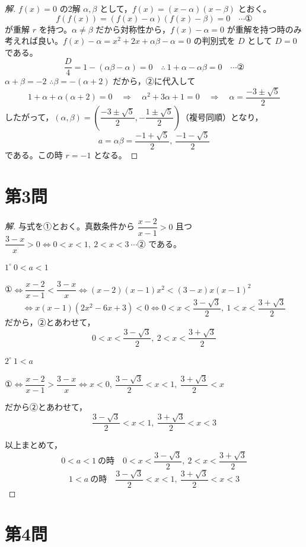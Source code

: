 \documentclass[../main.tex]{subfiles}
\begin{document}
\begin{proof}[解]
  $f(x)=0$ の2解 $\alpha,\beta$ として，$f(x)=(x-\alpha)(x-\beta)$ とおく。
  \[
    f(f(x))=(f(x)-\alpha)(f(x)-\beta)=0 \quad \cdots \text{①}
  \]
  が重解 $r$ を持つ。$\alpha\ne\beta$ だから対称性から，$f(x)-\alpha=0$ が重解を持つ時のみ考えれば良い。$f(x)-\alpha=x^2+2x+\alpha\beta-\alpha=0$ の判別式を $D$ として $D=0$ である。
  \[
    \frac{D}{4}=1-(\alpha\beta-\alpha)=0 \quad\therefore\ 1+\alpha-\alpha\beta=0 \quad \cdots \text{②}
  \]
  $\alpha+\beta=-2$ $\therefore \beta=-(\alpha+2)$ だから，②に代入して
  \[
    1+\alpha+\alpha(\alpha+2)=0 \quad\Longrightarrow\quad \alpha^2+3\alpha+1=0 \quad\Longrightarrow\quad \alpha=\frac{-3\pm\sqrt5}{2}
  \]
  したがって，$(\alpha,\beta)=\left(\dfrac{-3\pm\sqrt5}{2},-\dfrac{1\pm\sqrt5}{2}\right)$（複号同順）となり，
  \[
    a=\alpha\beta=\frac{-1+\sqrt5}{2},\ \frac{-1-\sqrt5}{2}
  \]
  である。この時 $r=-1$ となる。
\end{proof}

\newpage

\section*{第3問}

\begin{proof}[解]
  与式を①とおく。真数条件から $\dfrac{x-2}{x-1}>0$ 且つ $\dfrac{3-x}{x}>0 \iff 0<x<1,\ 2<x<3\ \cdots$② である。

  \textbf{$1^\circ\ 0<a<1$}

  ①$\iff \dfrac{x-2}{x-1}<\dfrac{3-x}{x} \iff (x-2)(x-1)x^2<(3-x)x(x-1)^2$
  \[
    \iff x(x-1)(2x^2-6x+3)<0 \iff 0<x<\frac{3-\sqrt3}{2},\ 1<x<\frac{3+\sqrt3}{2}
  \]
  だから，②とあわせて，
  \[
    0<x<\frac{3-\sqrt3}{2},\ 2<x<\frac{3+\sqrt3}{2}
  \]

  \textbf{$2^\circ\ 1<a$}

  ①$\iff \dfrac{x-2}{x-1}>\dfrac{3-x}{x} \iff x<0,\ \dfrac{3-\sqrt3}{2}<x<1,\ \dfrac{3+\sqrt3}{2}<x$

  だから②とあわせて，
  \[
    \frac{3-\sqrt3}{2}<x<1,\ \frac{3+\sqrt3}{2}<x<3
  \]

  以上まとめて，
  \[
    0<a<1\ \text{の時}\quad 0<x<\frac{3-\sqrt3}{2},\ 2<x<\frac{3+\sqrt3}{2}
  \]
  \[
    1<a\ \text{の時}\quad \frac{3-\sqrt3}{2}<x<1,\ \frac{3+\sqrt3}{2}<x<3
  \]
\end{proof}

\newpage

\section*{第4問}
\end{document}
